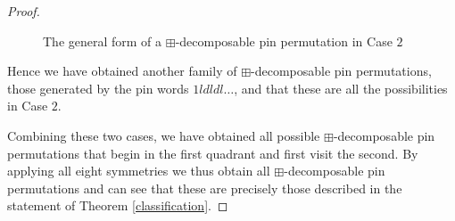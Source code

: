 \documentclass[11pt,a4paper]{article}
\theoremstyle{definition}
\begin{document}
\begin{proof}
\begin{figure}[h]
\begin{center}
\end{center}
\caption{The general form of a $\boxplus$-decomposable pin permutation in Case $2$}
\label{fig:boxdec6}
\end{figure}

Hence we have obtained another family of $\boxplus$-decomposable pin permutations, those generated by the pin words $1ldldl \dots$, and that these are all the possibilities in Case $2$.

Combining these two cases, we have obtained all possible $\boxplus$-decomposable pin permutations that begin in the first quadrant and first visit the second. By applying all eight symmetries we thus obtain all $\boxplus$-decomposable pin permutations and can see that these are precisely those described in the statement of Theorem \ref{classification}. \end{proof}
\end{document}
